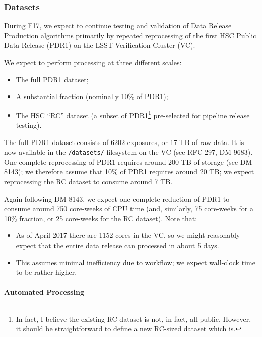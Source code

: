 

\subsubsection{Datasets}\label{datasets}

During F17, we expect to continue testing and validation of Data Release
Production algorithms primarily by repeated reprocessing of the first
HSC Public Data Release (PDR1) on the LSST Verification Cluster (VC).

We expect to perform processing at three different scales:

\begin{itemize}
\item
  The full PDR1 dataset;
\item
  A substantial fraction (nominally 10\% of PDR1);
\item
  The HSC ``RC'' dataset (a subset of PDR1\footnote{In fact, I believe
    the existing RC dataset is not, in fact, all public. However, it
    should be straightforward to define a new RC-sized dataset which is.}
  pre-selected for pipeline release testing).
\end{itemize}

The full PDR1 dataset consists of 6202 exposures, or 17 TB of raw data.
It is now available in the \texttt{/datasets/} filesystem on the VC (see
RFC-297, DM-9683). One complete reprocessing of PDR1 requires around 200
TB of storage (see DM-8143); we therefore assume that 10\% of PDR1
requires around 20 TB; we expect reprocessing the RC dataset to consume
around 7 TB.

Again following DM-8143, we expect one complete reduction of PDR1 to
consume around 750 core-weeks of CPU time (and, similarly, 75 core-weeks
for a 10\% fraction, or 25 core-weeks for the RC dataset). Note that:

\begin{itemize}
\item
  As of April 2017 there are 1152 cores in the VC, so we might
  reasonably expect that the entire data release can processed in about
  5 days.
\item
  This assumes minimal inefficiency due to workflow; we expect
  wall-clock time to be rather higher.
\end{itemize}

\paragraph{Automated Processing}\label{automated-processing}

